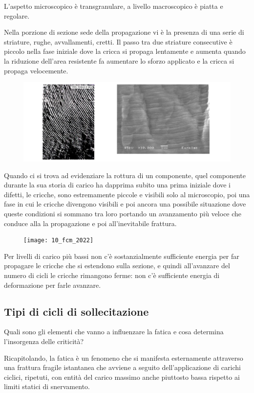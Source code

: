 		L'aspetto microscopico è transgranulare, a livello macroscopico è piatta e regolare. 
		
		Nella porzione di sezione sede della propagazione vi è la presenza di una serie di striature, rughe, avvallamenti, cretti. Il passo tra due striature consecutive è piccolo nella fase iniziale dove la cricca si propaga lentamente e aumenta quando la riduzione dell’area resistente fa aumentare lo sforzo applicato e la cricca si propaga velocemente. 
		
		\begin{figure}[H]
			\centering
			\includegraphics[width=0.5\linewidth]{immagini_10/screenshot010}
			\label{fig:screenshot010}
		\end{figure}		
		
		Quando ci si trova ad evidenziare la rottura di un componente, quel componente durante la sua storia di carico ha dapprima subito una prima iniziale dove i difetti, le cricche, sono estremamente piccole e visibili solo al microscopio, poi una fase in cui le cricche divengono visibili e poi ancora una possibile situazione dove queste condizioni si sommano tra loro portando un avanzamento più veloce che conduce alla la propagazione e poi all'inevitabile frattura.
		

	\begin{figure}[H]
	\texttt{[image: 10\_fcm\_2022]}
	\end{figure}

		
		Per  livelli di carico più bassi non c'è sostanzialmente sufficiente energia per far propagare le cricche che si estendono sulla sezione, e quindi all'avanzare del numero di cicli le cricche rimangono ferme: non c'è sufficiente energia di deformazione per farle avanzare. \newpage  
		
\subsection{Tipi di cicli di sollecitazione}
		Quali sono gli elementi che vanno a influenzare la fatica e cosa determina l'insorgenza delle criticità?
		
		Ricapitolando, la fatica è un fenomeno che si manifesta esternamente attraverso una frattura fragile istantanea che avviene a seguito dell'applicazione di carichi ciclici, ripetuti, con entità del carico massimo anche piuttosto bassa rispetto ai limiti statici di snervamento. 
		
